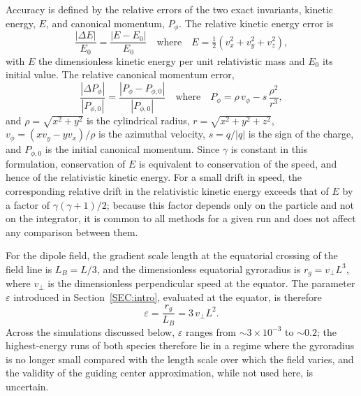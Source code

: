 \documentclass{article}
\begin{document}
Accuracy is defined by the relative errors of the two exact invariants, kinetic energy, $E$, and canonical momentum, $P_{\phi}$. The relative kinetic energy error is
        \begin{equation*}
            \frac{|\Delta E|}{E_0}=\frac{|E-E_0|}{E_0}
            \quad\mbox{where}\quad
            E = \tfrac{1}{2}\left(v_x^2+v_y^2+v_z^2\right),
        \end{equation*}
with $E$ the dimensionless kinetic energy per unit relativistic mass and $E_0$ its initial value. The relative canonical momentum error,
        \begin{equation*}
            \frac{|\Delta P_{\phi}|}{|P_{\phi,0}|}=\frac{|P_\phi-P_{\phi,0}|}{|P_{\phi,0}|}
            \quad\mbox{where}\quad
            P_\phi = \rho\, v_\phi - s\,\frac{\rho^2}{r^3},
        \end{equation*}
and $\rho = \sqrt{x^2 + y^2}$ is the cylindrical radius, $r = \sqrt{x^2 + y^2 + z^2}$, $v_\phi = (x v_y - y v_x)/\rho$ is the azimuthal velocity, $s = q/|q|$ is the sign of the charge, and $P_{\phi,0}$ is the initial canonical momentum. Since $\gamma$ is constant in this formulation, conservation of $E$ is equivalent to conservation of the speed, and hence of the relativistic kinetic energy. For a small drift in speed, the corresponding relative drift in the relativistic kinetic energy exceeds that of $E$ by a factor of $\gamma(\gamma+1)/2$; because this factor depends only on the particle and not on the integrator, it is common to all methods for a given run and does not affect any comparison between them.

For the dipole field, the gradient scale length at the equatorial crossing of the field line is $L_B = L/3$, and the dimensionless equatorial gyroradius is $r_g = v_{\perp} L^{3}$, where $v_{\perp}$ is the dimensionless perpendicular speed at the equator. The parameter $\varepsilon$ introduced in Section~\ref{SEC:intro}, evaluated at the equator, is therefore
        \begin{equation*}
            \varepsilon = \frac{r_g}{L_B} = 3\, v_{\perp} L^{2}.
        \end{equation*}
Across the simulations discussed below, $\varepsilon$ ranges from ${\sim}3\times10^{-3}$ to ${\sim}0.2$; the highest-energy runs of both species therefore lie in a regime where the gyroradius is no longer small compared with the length scale over which the field varies, and the validity of the guiding center approximation, while not used here, is uncertain.
\end{document}
